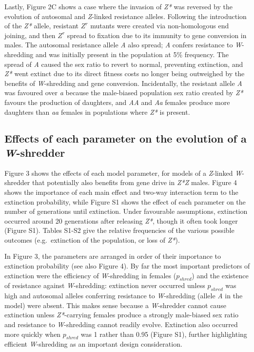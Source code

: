 \documentclass[]{rsos}%
\begin{document}
Lastly, Figure 2C shows a case where the invasion of \emph{Z*} was
reversed by the evolution of autosomal and \emph{Z}-linked resistance
alleles. Following the introduction of the \emph{Z*} allele, resistant
\(Z^r\) mutants were created via non-homologous end joining, and then
\(Z^r\) spread to fixation due to its immunity to gene conversion in
males. The autosomal resistance allele \emph{A} also spread; \emph{A}
confers resistance to \emph{W}-shredding and was initially present in
the population at 5\% frequency. The spread of \emph{A} caused the sex
ratio to revert to normal, preventing extinction, and \emph{Z*} went
extinct due to its direct fitness costs no longer being outweighed by
the benefits of \emph{W}-shredding and gene conversion. Incidentally,
the resistant allele \emph{A} was favoured over \emph{a} because the
male-biased population sex ratio created by \emph{Z*} favours the
production of daughters, and \emph{AA} and \emph{Aa} females produce
more daughters than \emph{aa} females in populations where \emph{Z*} is
present.

\hypertarget{effects-of-each-parameter-on-the-evolution-of-a-w-shredder}{%
\subsection{\texorpdfstring{Effects of each parameter on the evolution
of a
\emph{W}-shredder}{Effects of each parameter on the evolution of a W-shredder}}\label{effects-of-each-parameter-on-the-evolution-of-a-w-shredder}}

Figure 3 shows the effects of each model parameter, for models of a
\emph{Z}-linked \emph{W}-shredder that potentially also benefits from
gene drive in \emph{Z*Z} males. Figure 4 shows the importance of each
main effect and two-way interaction term to the extinction probability,
while Figure S1 shows the effect of each parameter on the number of
generations until extinction. Under favourable assumptions, extinction
occurred around 20 generations after releasing \emph{Z*}, though it
often took longer (Figure S1). Tables S1-S2 give the relative
frequencies of the various possible outcomes (e.g.~extinction of the
population, or loss of \emph{Z*}).

In Figure 3, the parameters are arranged in order of their importance to
extinction probability (see also Figure 4). By far the most important
predictors of extinction were the efficiency of \emph{W}-shredding in
females (\(p_{shred}\)) and the existence of resistance against
\emph{W}-shredding: extinction never occurred unless \(p_{shred}\) was
high and autosomal alleles conferring resistance to \emph{W}-shredding
(allele \emph{A} in the model) were absent. This makes sense because a
\emph{W}-shredder cannot cause extinction unless \emph{Z*}-carrying
females produce a strongly male-biased sex ratio and resistance to
\emph{W}-shredding cannot readily evolve. Extinction also occurred more
quickly when \(p_{shred}\) was 1 rather than 0.95 (Figure S1), further
highlighting efficient \emph{W}-shredding as an important design
consideration.
\end{document}
